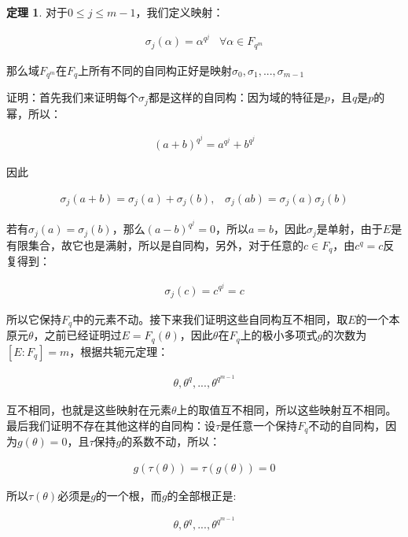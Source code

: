 \documentclass[12pt, a4paper, oneside]{ctexart}
\theoremstyle{definition}
\newtheorem*{theorem}{定理}
\begin{document}
\begin{theorem}
对于$0\leqslant j\leqslant m-1$，我们定义映射：

\begin{align*}
\sigma_j(\alpha)=\alpha^{q^j}\;\;\; \forall \alpha\in F_{q^m}
\end{align*}

那么域$F_{q^m}$在$F_q$上所有不同的自同构正好是映射$\sigma_0,\sigma_1,...,\sigma_{m-1}$
\end{theorem}

证明：首先我们来证明每个$\sigma_j$都是这样的自同构：因为域的特征是$p$，且$q$是$p$的幂，所以：

\begin{align*}
(a+b)^{q^j}=a^{q^j}+b^{q^j}
\end{align*}

因此

\begin{align*}
\sigma_j(a+b)=\sigma_j(a)+\sigma_j(b),\;\;\; \sigma_j(ab)=\sigma_j(a)\sigma_j(b)
\end{align*}

若有$\sigma_j(a)=\sigma_j(b)$，那么$(a-b)^{q^j}=0$，所以$a=b$，因此$\sigma_j$是单射，由于$E$是有限集合，故它也是满射，所以是自同构，另外，对于任意的$c\in F_q$，由$c^q=c$反复得到：

\begin{align*}
\sigma_j(c)=c^{q^j}=c
\end{align*}

所以它保持$F_q$中的元素不动。接下来我们证明这些自同构互不相同，取$E$的一个本原元$\theta$，之前已经证明过$E=F_q(\theta)$，因此$\theta$在$F_q$上的极小多项式$g$的次数为$[E:F_q]=m$，根据共轭元定理：

\begin{align*}
\theta,\theta^q,...,\theta^{q^{m-1}}
\end{align*}

互不相同，也就是这些映射在元素$\theta$上的取值互不相同，所以这些映射互不相同。最后我们证明不存在其他这样的自同构：设$\tau$是任意一个保持$F_q$不动的自同构，因为$g(\theta)=0$，且$\tau$保持$g$的系数不动，所以：

\begin{align*}
g(\tau(\theta))=\tau(g(\theta))=0
\end{align*}

所以$\tau(\theta)$必须是$g$的一个根，而$g$的全部根正是:

\begin{align*}
\theta,\theta^q,...,\theta^{q^{m-1}}
\end{align*}
\end{document}

